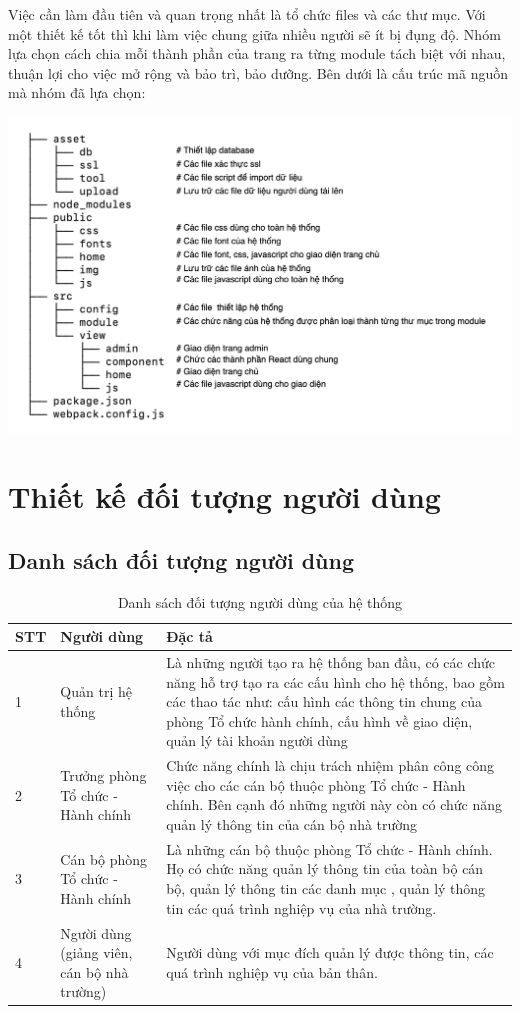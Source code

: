 Việc cần làm đầu tiên và quan trọng nhất là tổ chức files và các thư mục. Với một thiết kế tốt thì khi làm việc chung giữa nhiều người sẽ ít bị đụng độ. Nhóm lựa chọn cách chia mỗi thành phần của trang ra từng module tách biệt với nhau, thuận lợi cho việc mở rộng và bảo trì, bảo dưỡng. Bên dưới là cấu trúc mã nguồn mà nhóm đã lựa chọn:
\begin{center}
  \captionsetup{type=figure}
  \includegraphics[width=15cm]{img/tree.png}
\end{center}
\section{Thiết kế đối tượng người dùng}
\subsection{Danh sách đối tượng người dùng}
\begin{table}[H]
    \centering
	\begin{tabular}{|p{1cm}|p{4cm}|p{10cm}|}
    \hline
    \textbf{STT}&\textbf{Người dùng}&\textbf{Đặc tả}\\
	\hline
    1&Quản trị hệ thống&Là những người tạo ra hệ thống ban đầu, có các chức năng hỗ trợ tạo ra các cấu hình cho hệ thống, bao gồm các thao tác như: cấu hình các thông tin chung của phòng Tổ chức hành chính, cấu hình về giao diện, quản lý tài khoản người dùng\\
	\hline
    2&Trưởng phòng Tổ chức - Hành chính&Chức năng chính là chịu trách nhiệm phân công công việc cho các cán bộ thuộc phòng Tổ chức - Hành chính. Bên cạnh đó những người này còn có chức năng quản lý thông tin của cán bộ nhà trường\\
	\hline
    3&Cán bộ phòng Tổ chức - Hành chính&Là những cán bộ thuộc phòng Tổ chức - Hành chính. Họ có chức năng quản lý thông tin của toàn bộ cán bộ, quản lý thông tin các danh mục , quản lý thông tin các quá trình nghiệp vụ của nhà trường.\\
	\hline
	4&Người dùng (giảng viên, cán bộ nhà trường)&Người dùng với mục đích quản lý được thông tin, các quá trình nghiệp vụ của bản thân.\\
	\hline
\end{tabular}
\caption{Danh sách đối tượng người dùng của hệ thống}
\end{table}
